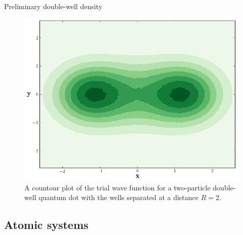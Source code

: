 \begin{frame}
 Preliminary double-well density
 
 \begin{figure}[h]
 \begin{center}
 \includegraphics[scale=0.25]{../graphics/DoubleWell.png}
  \caption{A countour plot of the trial wave function for a two-particle double-well quantum dot with the wells separated at a distance $R = 2$.}
  \label{fig:doubleWell}
 \end{center}
\end{figure}
 
\end{frame}


\subsection{Atomic systems}

